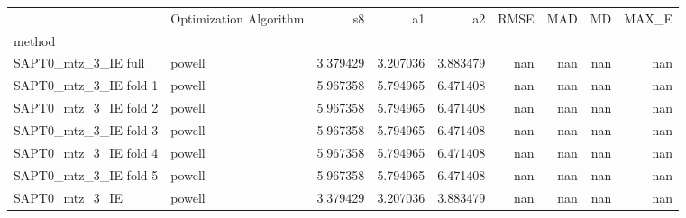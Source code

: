 \begin{tabular}{llrrrrrrr}
 & Optimization Algorithm & s8 & a1 & a2 & RMSE & MAD & MD & MAX_E \\
method &  &  &  &  &  &  &  &  \\
SAPT0_mtz_3_IE full & powell & 3.379429 & 3.207036 & 3.883479 & nan & nan & nan & nan \\
SAPT0_mtz_3_IE fold 1 & powell & 5.967358 & 5.794965 & 6.471408 & nan & nan & nan & nan \\
SAPT0_mtz_3_IE fold 2 & powell & 5.967358 & 5.794965 & 6.471408 & nan & nan & nan & nan \\
SAPT0_mtz_3_IE fold 3 & powell & 5.967358 & 5.794965 & 6.471408 & nan & nan & nan & nan \\
SAPT0_mtz_3_IE fold 4 & powell & 5.967358 & 5.794965 & 6.471408 & nan & nan & nan & nan \\
SAPT0_mtz_3_IE fold 5 & powell & 5.967358 & 5.794965 & 6.471408 & nan & nan & nan & nan \\
SAPT0_mtz_3_IE & powell & 3.379429 & 3.207036 & 3.883479 & nan & nan & nan & nan \\
\end{tabular}
